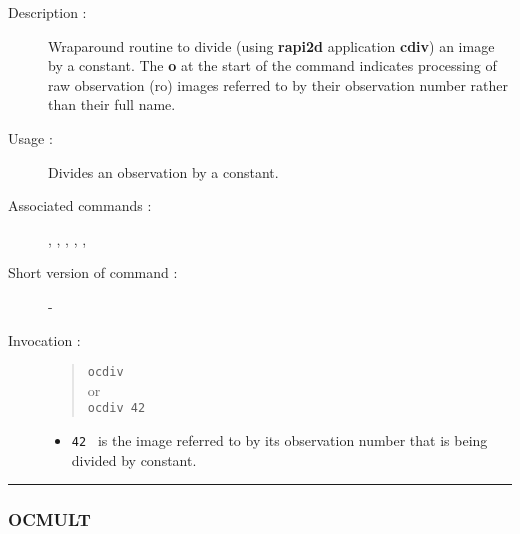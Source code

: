 \begin{description}

\item[Description :] Wraparound routine to divide (using {\bf rapi2d}
application {\bf cdiv}) an image by a constant. The {\bf o} at the start of the
command indicates processing of raw observation ({\sc ro}) images
referred to by their observation number rather than their full name.

\item[Usage :] Divides an observation by a constant.

\item[Associated commands :] {\tt {}}, 
{\tt {}}, {\tt {}}, 
{\tt {}}, {\tt {}}, {\tt {}}

\item[Short version of command :] -
\item[Invocation :]

\begin{quote}{\tt  ocdiv }\\
or \\
{\tt ocdiv 42 }
\end{quote}

\begin{itemize}

\item {\tt 42 } is the image referred to by its observation number that
is being divided by constant.
\end{itemize}

\end{description}

\hrule 
\subsubsection*{\label{OCMULT}OCMULT}

